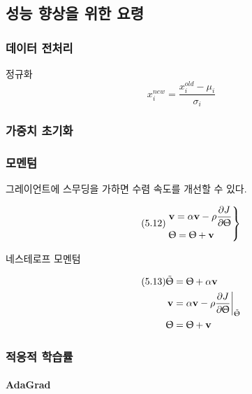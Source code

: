 \documentclass [12pt] {oblivoir}
\let\oldsubsubsection=\subsubsection
\renewcommand{\subsubsection}
{
  \filbreak
  \oldsubsubsection
}
\begin{document}
\subsection{성능 향상을 위한 요령}

\subsubsection{데이터 전처리}

정규화
\begin{equation} \tag{5.9}
  x_{i}^{new} = \frac{x_{i}^{old} - \mu_{i}}{\sigma_{i}}
\end{equation}

\subsubsection{가중치 초기화}

\subsubsection{모멘텀}

그레이언트에 스무딩을 가하면 수렴 속도를 개선할 수 있다.

\begin{equation} \tag{5.12}
  \begin{rcases}
    \mathbf{v} = \alpha\mathbf{v} - \rho\displaystyle\frac{\partial J}{\partial\Uptheta} \\
    \Uptheta = \Uptheta + \mathbf{v}
  \end{rcases}
\end{equation}

네스테로프 모멘텀

\begin{align*} \tag{5.13}
    \tilde{\Uptheta} &= \Uptheta + \alpha \mathbf{v} \\
     \mathbf{v} &= \alpha \mathbf{v} - \rho \frac{\partial J}{\partial \Uptheta}\bigg|_{\tilde{\Uptheta}} \\
    \Uptheta &= \Uptheta + \mathbf{v}
\end{align*}


\subsubsection{적응적 학습률}

\paragraph*{AdaGrad}\mbox{}
\end{document}
